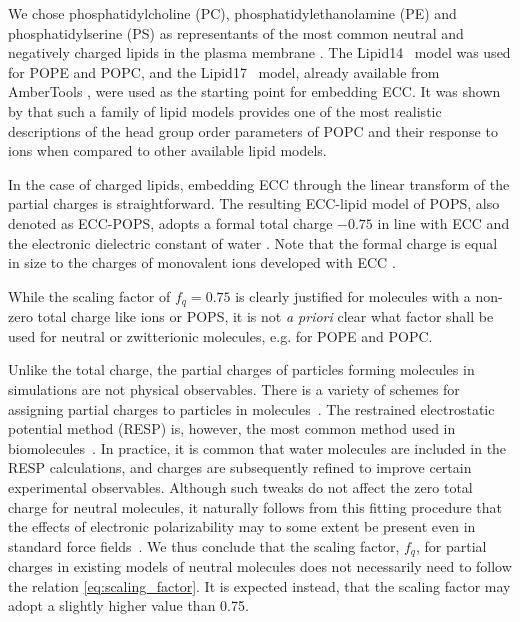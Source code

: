 We chose phosphatidylcholine (PC), phosphatidylethanolamine (PE) and phosphatidylserine (PS)
as representants of the most common neutral and negatively charged lipids in the plasma membrane \citep{the_review_with_pie_charts_on_my_desk, marsh13}. 
The Lipid14~\citep{dickson14} model was used for POPE and POPC,
and the Lipid17~\citep{lipid17-future} model, already available from AmberTools \citep{ferrer13},
were used as the starting point for embedding ECC.
It was shown by \citet{botan15, catte16} that such a family of lipid models provides one of the most 
realistic descriptions of the head group order parameters of POPC and their response to ions 
when compared to other available lipid models. 

In the case of charged lipids, 
embedding ECC through the linear transform of the partial charges is straightforward. 
The resulting ECC-lipid model of POPS, also denoted as ECC-POPS, 
adopts a formal total charge $-0.75$ in line with ECC and the electronic dielectric constant of water \citep{leontyev14}. 
Note that the formal charge is equal in size to the charges of monovalent ions developed with ECC \citep{Pluharova2014, kohagen14, kohagen16, martinek17}.

While the scaling factor of $f_q = 0.75$ is clearly justified for molecules with a non-zero total charge like ions or POPS,
it is not \emph{a priori} clear what factor shall be used for neutral or zwitterionic molecules, e.g. for POPE and POPC. 

Unlike the total charge, the partial charges of particles forming molecules in simulations are not physical observables. 
There is a variety of schemes for assigning partial charges to particles in molecules~\citep{Hu2007}. 
The restrained electrostatic potential method (RESP) is, however, the most common method used in biomolecules~\citep{RESP_paper, Singh1984, dickson14}. 
In practice, it is common that water molecules are included in the RESP calculations, 
and charges are subsequently refined to improve certain experimental observables. 
Although such tweaks do not affect the zero total charge for neutral molecules,
it naturally follows from this fitting procedure that the effects of electronic polarizability 
may to some extent be present even in standard force fields~\citep{RESP_paper, Singh1984, jorgensen96, ipolq2013, benavides17}. 
We thus conclude that the scaling factor, $f_q$, for partial charges in existing models of neutral molecules does not necessarily need to follow the relation \ref{eq:scaling_factor}.
It is expected instead, that the scaling factor may adopt a slightly higher value than 0.75. 

